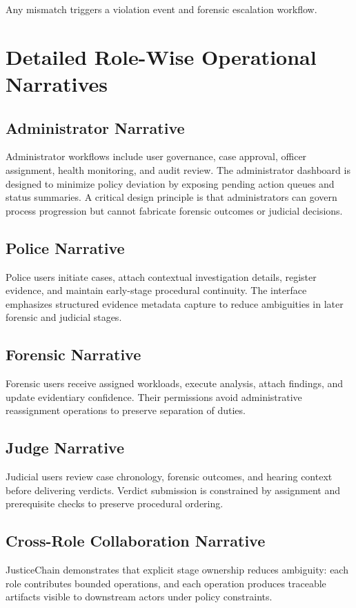 \documentclass[conference]{IEEEtran}
\begin{document}
Any mismatch triggers a violation event and forensic escalation workflow.

\section{Detailed Role-Wise Operational Narratives}
\subsection{Administrator Narrative}
Administrator workflows include user governance, case approval, officer assignment, health monitoring, and audit review. The administrator dashboard is designed to minimize policy deviation by exposing pending action queues and status summaries. A critical design principle is that administrators can govern process progression but cannot fabricate forensic outcomes or judicial decisions.

\subsection{Police Narrative}
Police users initiate cases, attach contextual investigation details, register evidence, and maintain early-stage procedural continuity. The interface emphasizes structured evidence metadata capture to reduce ambiguities in later forensic and judicial stages.

\subsection{Forensic Narrative}
Forensic users receive assigned workloads, execute analysis, attach findings, and update evidentiary confidence. Their permissions avoid administrative reassignment operations to preserve separation of duties.

\subsection{Judge Narrative}
Judicial users review case chronology, forensic outcomes, and hearing context before delivering verdicts. Verdict submission is constrained by assignment and prerequisite checks to preserve procedural ordering.

\subsection{Cross-Role Collaboration Narrative}
JusticeChain demonstrates that explicit stage ownership reduces ambiguity: each role contributes bounded operations, and each operation produces traceable artifacts visible to downstream actors under policy constraints.
\end{document}
